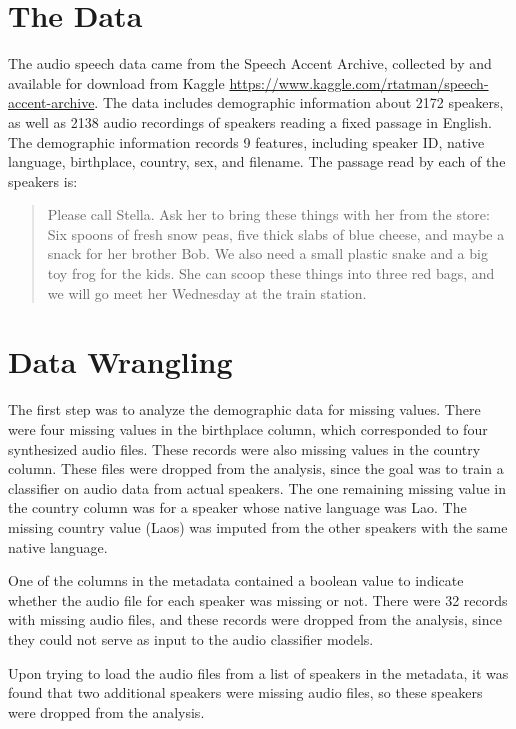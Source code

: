 \section{The Data}

The audio speech data came from the Speech Accent Archive, collected by \cite{AccentArchive} and available for download from Kaggle \url{https://www.kaggle.com/rtatman/speech-accent-archive}. The data includes demographic information about 2172 speakers, as well as 2138 audio recordings of speakers reading a fixed passage in English.  The demographic information records 9 features, including speaker ID, native language, birthplace, country, sex, and filename. The passage read by each of the speakers is:

\begin{quotation}
Please call Stella.  Ask her to bring these things with her from the store:  Six spoons of fresh snow peas, five thick slabs of blue cheese, and maybe a snack for her brother Bob.  We also need a small plastic snake and a big toy frog for the kids.  She can scoop these things into three red bags, and we will go meet her Wednesday at the train station. \cite{AccentArchive}
\end{quotation}

\section{Data Wrangling}

The first step was to analyze the demographic data for missing values. There were four missing values in the birthplace column, which corresponded to four synthesized audio files. These records were also missing values in the country column. These files were dropped from the analysis, since the goal was to train a classifier on audio data from actual speakers. The one remaining missing value in the country column was for a speaker whose native language was Lao. The missing country value (Laos) was imputed from the other speakers with the same native language.

One of the columns in the metadata contained a boolean value to indicate whether the audio file for each speaker was missing or not. There were 32 records with missing audio files, and these records were dropped from the analysis, since they could not serve as input to the audio classifier models.

Upon trying to load the audio files from a list of speakers in the metadata, it was found that two additional speakers were missing audio files, so these speakers were dropped from the analysis.

